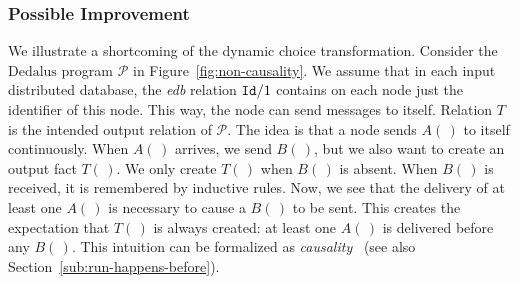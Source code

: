 \documentclass{tlp}
\newcommand{\langname}[1]{\text{#1}}  \newcommand{\pred}[1]{\mathtt{#1}}  \newcommand{\fname}[1]{\mathit{#1}}  \newcommand{\sq}[1]{`{#1}'}
\newcommand{\dedalus}{\langname{Dedalus}}
\newcommand{\ded}{\mathcal{P}}
\newcommand{\rar}[2]{#1/#2}
\newcommand{\ntup}{(\,)}
\begin{document}
\subsubsection{Possible Improvement}

\label{sub:choice-transform-improvement}

\newcommand{\lsnd}{\mathrm{snd}}
 

\newcommand{\lrcv}{\mathrm{rcv}}
 

We illustrate a shortcoming of the dynamic choice transformation.
Consider the $\dedalus$ program $\ded$ in Figure~\ref{fig:non-causality}.
We assume that in each input distributed database, the \emph{edb}
relation $\rar{\relid}1$ contains on each node just the identifier
of this node. This way, the node can send messages to itself. Relation
$T$ is the intended output relation of $\ded$. The idea is that
a node sends $A\ntup$ to itself continuously. When $A\ntup$ arrives,
we send $B\ntup$, but we also want to create an output fact $T\ntup$.
We only create $T\ntup$ when $B\ntup$ is absent. When $B\ntup$
is received, it is remembered by inductive rules. Now, we see that
the delivery of at least one $A\ntup$ is necessary to cause a $B\ntup$
to be sent. This creates the expectation that $T\ntup$ is always
created: at least one $A\ntup$ is delivered before any $B\ntup$.
This intuition can be formalized as \emph{causality}~\cite{attiyawelch_dcbook}
(see also Section~\ref{sub:run-happens-before}). 
\end{document}
